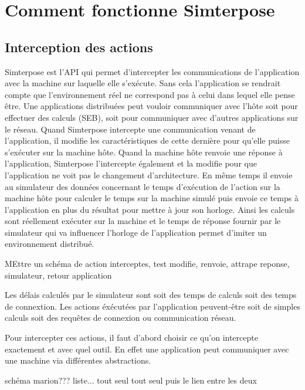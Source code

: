 \section{Comment fonctionne Simterpose}
\subsection{Interception des actions}
Simterpose est l'API qui permet d'intercepter les communications de
l'application avec la machine sur laquelle elle s'exécute. Sans cela
l'application se rendrait compte que l'environnement réel ne correspond pas à
celui dans lequel elle pense être. Une applications distribuées peut vouloir
communiquer avec l'hôte soit pour effectuer des calculs (SEB), soit pour
communiquer avec d'autres applications sur le réseau. Quand Simterpose
intercepte une communication venant de l'application, il modifie les
caractéristiques de cette dernière pour qu'elle puisse s'exécuter sur la machine
hôte. Quand la machine hôte renvoie une réponse à l'application, Simterpose
l'intercepte également et la modifie pour que l'application ne voit pas le
changement d'architecture. En même temps il envoie au simulateur des données
concernant le temps d'exécution de l'action sur la machine hôte pour calculer le
temps sur la machine simulé puis envoie ce temps à l'application en plus du
résultat pour mettre à jour son horloge. Ainsi les calculs sont réellement
exécuter sur la machine et le temps de réponse fournir par le simulateur qui va
influencer l'horloge de l'application permet d'imiter un environnement
distribué. 

{\color{red} MEttre un schéma de action interceptes, test modifie, renvoie,
  attrape reponse, simulateur, retour application}

Les délais calculés par le simulateur sont soit des temps de calculs soit des
temps de connextion. Les actions éxécutées par l'application peuvent-être soit
de simples calculs soit des requêtes de connexion ou communication réseau.

Pour intercepter ces actions, il faut d'abord choisir ce qu'on intercepte
exactement et avec quel outil. En effet une application peut communiquer avec
une machine via différentes abstractions.

{\color{red} schéma marion???} liste... tout seul tout seul puis le lien entre
les deux

